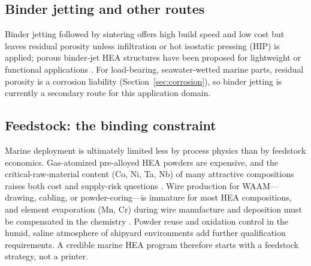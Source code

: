\subsection{Binder jetting and other routes}

Binder jetting followed by sintering offers high build speed and low cost but leaves residual porosity unless infiltration or hot isostatic pressing (HIP) is applied; porous binder-jet HEA structures have been proposed for lightweight or functional applications \cite{cagirici2024}. For load-bearing, seawater-wetted marine parts, residual porosity is a corrosion liability (Section~\ref{sec:corrosion}), so binder jetting is currently a secondary route for this application domain.

\subsection{Feedstock: the binding constraint}

Marine deployment is ultimately limited less by process physics than by feedstock economics. Gas-atomized pre-alloyed HEA powders are expensive, and the critical-raw-material content (Co, Ni, Ta, Nb) of many attractive compositions raises both cost and supply-risk questions \cite{cagirici2024,han2025}. Wire production for WAAM---drawing, cabling, or powder-coring---is immature for most HEA compositions, and element evaporation (Mn, Cr) during wire manufacture and deposition must be compensated in the chemistry \cite{andersson2026waam}. Powder reuse and oxidation control in the humid, saline atmosphere of shipyard environments add further qualification requirements. A credible marine HEA program therefore starts with a feedstock strategy, not a printer.
